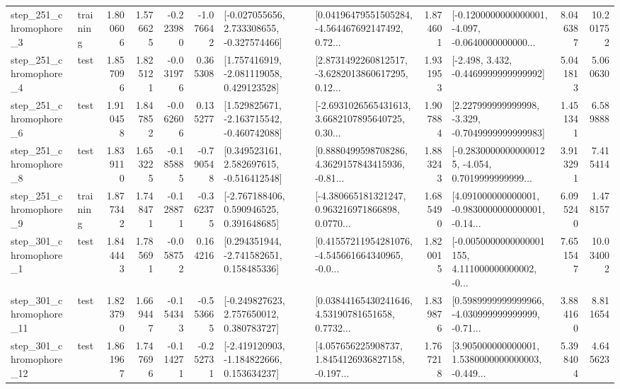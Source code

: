 \begin{tabular}{llrrrrllrlrr}
   step\_251\_chromophore\_3 &  training &      1.800606 &    1.576625 &     -0.223980 & -1.076642 &   [-0.027055656, 2.733308655, -0.327574466] &  [0.04196479551505284, -4.564467692147492, 0.72... &       1.874601 &  [-0.1200000000000001, -4.097, -0.0640000000000... &            8.046387 &         10.201752 \\
   step\_251\_chromophore\_4 &      test &      1.857096 &    1.825121 &     -0.031976 &  0.365308 &    [1.757416919, -2.081119058, 0.429123528] &  [2.8731492260812517, -3.6282013860617295, 0.12... &       1.931953 &               [-2.498, 3.432, -0.4469999999999992] &            5.041813 &          5.060630 \\
   step\_251\_chromophore\_6 &      test &      1.910458 &    1.847852 &     -0.062606 &  0.135277 &   [1.529825671, -2.163715542, -0.460742088] &  [-2.6931026565431613, 3.6682107895640725, 0.30... &       1.907884 &   [2.227999999999998, -3.329, -0.7049999999999983] &            1.451341 &          6.589888 \\
   step\_251\_chromophore\_8 &      test &      1.839110 &    1.653225 &     -0.185885 & -0.790548 &    [0.349523161, 2.582697615, -0.516412548] &  [0.8880499598708286, 4.3629157843415936, -0.81... &       1.883243 &  [-0.28300000000000125, -4.054, 0.7019999999999... &            3.913291 &          7.415414 \\
   step\_251\_chromophore\_9 &  training &      1.877342 &    1.748471 &     -0.128871 & -0.362375 &    [-2.767188406, 0.590946525, 0.391648685] &  [-4.380665181321247, 0.963216971866898, 0.0770... &       1.685490 &  [4.091000000000001, -0.9830000000000001, -0.14... &            6.095240 &          1.478157 \\
   step\_301\_chromophore\_1 &      test &      1.844443 &    1.785691 &     -0.058752 &  0.164216 &    [0.294351944, -2.741582651, 0.158485336] &  [0.41557211954281076, -4.545661664340965, -0.0... &       1.820015 &  [-0.0050000000000001155, 4.111000000000002, -0... &            7.651547 &         10.034002 \\
  step\_301\_chromophore\_11 &      test &      1.823790 &    1.669447 &     -0.154343 & -0.553665 &    [-0.249827623, 2.757650012, 0.380783727] &  [0.03844165430241646, 4.53190781651658, 0.7732... &       1.839876 &  [0.5989999999999966, -4.030999999999999, -0.71... &            3.884160 &          8.811654 \\
  step\_301\_chromophore\_12 &      test &      1.861967 &    1.747696 &     -0.114271 & -0.252731 &   [-2.419120903, -1.184822666, 0.153634237] &  [4.057656225908737, 1.8454126936827158, -0.197... &       1.767218 &  [3.905000000000001, 1.5380000000000003, -0.449... &            5.398404 &          4.645623 \\

\end{tabular}
